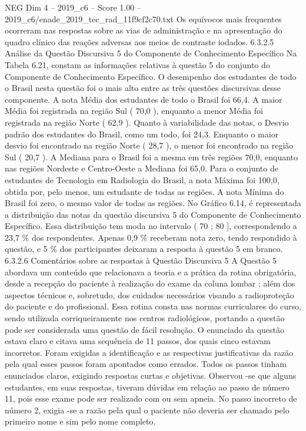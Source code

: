 \begin{textsample}{NEG Dim 4 – 2019\_c6 – Score 1.00 – 2019\_c6/enade\_2019\_tec\_rad\_11f9cf2c70.txt}
Os equívocos mais frequentes ocorreram nas respostas sobre as vias de administração e na apresentação do quadro clínico das reações adversas aos meios de contraste iodados. 6.3.2.5 Análise da Questão Discursiva 5 do Componente de Conhecimento Específico Na Tabela 6.21, constam as informações relativas à questão 5 do conjunto do Componente de Conhecimento Específico.
O desempenho dos estudantes de todo o Brasil nesta questão foi o mais alto entre as três questões discursivas desse componente.
A nota Média dos estudantes de todo o Brasil foi 66,4.
A maior Média foi registrada na região Sul ( 70,0 ), enquanto a menor Média foi registrada na região Norte ( 62,9 ).
Quanto à variabilidade das notas, o Desvio padrão dos estudantes do Brasil, como um todo, foi 24,3.
Enquanto o maior desvio foi encontrado na região Norte ( 28,7 ), o menor foi encontrado na região Sul ( 20,7 ).
A Mediana para o Brasil foi a mesma em três regiões 70,0, enquanto nas regiões Nordeste e Centro-Oeste a Mediana foi 65,0.
Para o conjunto de estudantes de Tecnologia em Radiologia do Brasil, a nota Máxima foi 100,0, obtida por, pelo menos, um estudante de todas as regiões.
A nota Mínima do Brasil foi zero, o mesmo valor de todas as regiões.
No Gráfico 6.14, é representada a distribuição das notas da questão discursiva 5 do Componente de Conhecimento Específico.
Essa distribuição tem moda no intervalo ( 70 ; 80 ], correspondendo a 23,7 \% dos respondentes.
Apenas 0,9 \% receberam nota zero, tendo respondido à questão, e 5 \% dos participantes deixaram a resposta à questão 5 em branco. 6.3.2.6 Comentários sobre as respostas à Questão Discursiva 5 A Questão 5 abordava um conteúdo que relacionava a teoria e a prática da rotina obrigatória, desde a recepção do paciente à realização do exame da coluna lombar ; além dos aspectos técnicos e, sobretudo, dos cuidados necessários visando a radioproteção do paciente e do profissional.
Essa rotina consta nas normas curriculares do curso, sendo utilizada corriqueiramente nos centros radiológicos, portando a questão pode ser considerada uma questão de fácil resolução.
O enunciado da questão estava claro e citava uma sequência de 11 passos, dos quais cinco estavam incorretos.
Foram exigidas a identificação e as respectivas justificativas da razão pela qual esses passos foram apontados como errados.
Todos os passos tinham enunciados claros, exigindo respostas curtas e objetivas.
Observou -se que alguns estudantes, em suas respostas, tiveram dúvidas em relação ao passo de número 11, pois esse exame pode ser realizado com ou sem apneia.
No passo incorreto de número 2, exigia -se a razão pela qual o paciente não deveria ser chamado pelo primeiro nome e sim pelo nome completo.

\end{textsample}
